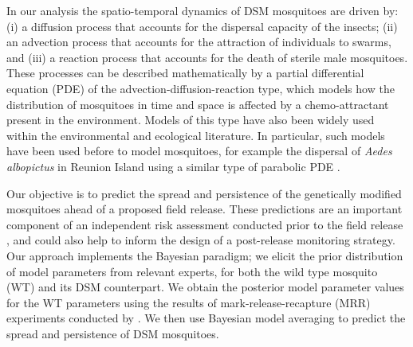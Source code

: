 \documentclass[]{bmcart}
\begin{document}

In our analysis the spatio-temporal dynamics of DSM mosquitoes are driven by: (i) a diffusion process that accounts for the dispersal capacity of the insects; (ii) an advection process that accounts for the attraction of individuals to swarms, and (iii) a reaction process that accounts for the death of sterile male mosquitoes. These processes can be described mathematically by a partial differential equation (PDE) of the advection-diffusion-reaction type, which models how the distribution of mosquitoes in time and space is affected by a chemo-attractant present in the environment. Models of this type have also been widely used within the environmental and ecological literature. In particular, such models have been used before to model mosquitoes, for example the dispersal of \emph{Aedes albopictus} in Reunion Island using a similar type of parabolic PDE \citep{Dufourd2012}.

Our objective is to predict the spread and persistence of the genetically modified mosquitoes ahead of a proposed field release. These predictions are an important component of an independent risk assessment conducted prior to the field release \cite{Hayes2015a}, and could also help to inform the design of a post-release monitoring strategy. Our approach implements the Bayesian paradigm; we elicit the prior distribution of model parameters from relevant experts, for both the wild type mosquito (WT) and its DSM counterpart. We obtain the posterior model parameter values for the WT parameters using the results of mark-release-recapture (MRR) experiments conducted by \cite{Epopa2017}. We then use Bayesian model averaging to predict the spread and persistence of DSM mosquitoes. 
\end{document}
